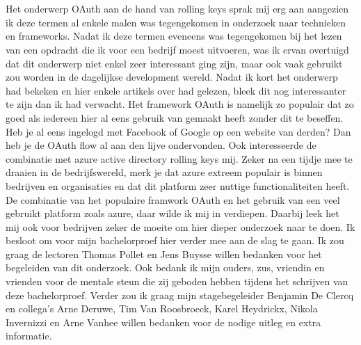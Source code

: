 
\chapter*{}
\label{ch:voorwoord}

Het onderwerp OAuth aan de hand van rolling keys sprak mij erg aan aangezien ik deze termen al enkele malen was tegengekomen in onderzoek naar technieken en frameworks. Nadat ik deze termen eveneens was tegengekomen bij het lezen van een opdracht die ik voor een bedrijf moest uitvoeren, was ik ervan overtuigd dat dit onderwerp niet enkel zeer interessant ging zijn, maar ook vaak gebruikt zou worden in de dagelijkse development wereld. \newline\newline
Nadat ik kort het onderwerp had bekeken en hier enkele artikels over had gelezen, bleek dit nog interessanter te zijn dan ik had verwacht. Het framework OAuth is namelijk zo populair dat zo goed als iedereen hier al eens gebruik van gemaakt heeft zonder dit te beseffen. Heb je al eens ingelogd met Facebook of Google op een website van derden? Dan heb je de OAuth flow al aan den lijve ondervonden. \newline\newline
Ook interesseerde de combinatie met azure active directory rolling keys mij. Zeker na een tijdje mee te draaien in de bedrijfswereld, merk je dat azure extreem populair is binnen bedrijven en organisaties en dat dit platform zeer nuttige functionaliteiten heeft. \newline\newline
De combinatie van het populaire framwork OAuth en het gebruik van een veel gebruikt platform zoals azure, daar wilde ik mij in verdiepen. Daarbij leek het mij ook voor bedrijven zeker de moeite om hier dieper onderzoek naar te doen. Ik besloot om voor mijn bachelorproef hier verder mee aan de slag te gaan. \newline\newline
Ik zou graag de lectoren Thomas Pollet en Jens Buysse willen bedanken voor het begeleiden van dit onderzoek. Ook bedank ik mijn ouders, zus, vriendin en vrienden voor de mentale steun die zij geboden hebben tijdens het schrijven van deze bachelorproef. Verder zou ik graag mijn stagebegeleider Benjamin De Clercq en collega's Arne Deruwe, Tim Van Roosbroeck, Karel Heydrickx, Nikola Invernizzi en Arne Vanhee willen bedanken voor de nodige uitleg en extra informatie.

